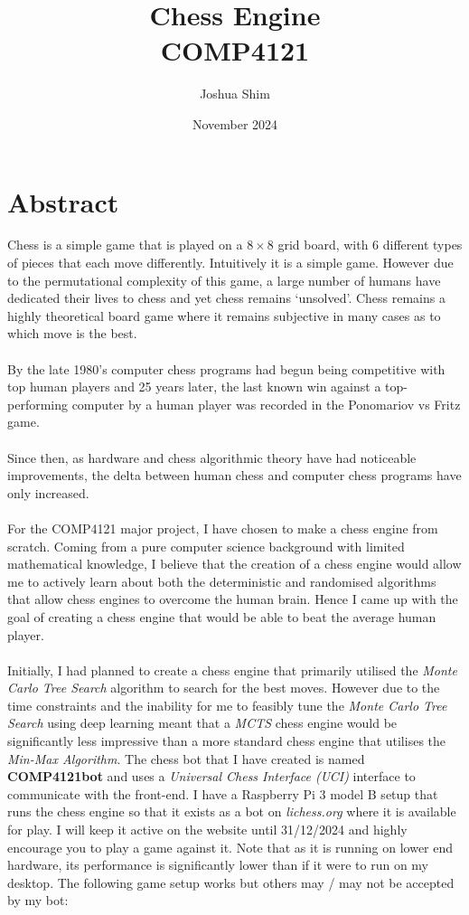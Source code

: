 \documentclass[a4paper,12pt]{report}
\title{Chess Engine\\
{\Large COMP4121}}
\author{Joshua Shim}
\date{November 2024}
\begin{document}
\maketitle
\chapter*{Abstract}

Chess is a simple game that is played on a $8 \times 8$ grid board, with 6 different types of pieces that each move differently. Intuitively it is a simple game. However due to the permutational complexity of this game, a large number of humans have dedicated their lives to chess and yet chess remains `unsolved'. Chess remains a highly theoretical board game where it remains subjective in many cases as to which move is the best.
\\\\
By the late 1980's computer chess programs had begun being competitive with top human players and 25 years later, the last known win against a top-performing computer by a human player was recorded in the Ponomariov vs Fritz game.
\\\\
Since then, as hardware and chess algorithmic theory have had noticeable improvements, the delta between human chess and computer chess programs have only increased.
\\\\
For the COMP4121 major project, I have chosen to make a chess engine from scratch. Coming from a pure computer science background with limited mathematical knowledge, I believe that the creation of a chess engine would allow me to actively learn about both the deterministic and randomised algorithms that allow chess engines to overcome the human brain. Hence I came up with the goal of creating a chess engine that would be able to beat the average human player.
\\\\
Initially, I had planned to create a chess engine that primarily utilised the \textit{Monte Carlo Tree Search} algorithm to search for the best moves. However due to the time constraints and the inability for me to feasibly tune the \textit{Monte Carlo Tree Search} using deep learning meant that a \textit{MCTS} chess engine would be significantly less impressive than a more standard chess engine that utilises the \textit{Min-Max Algorithm}.\newpage
The chess bot that I have created is named \textbf{COMP4121bot} and uses a \textit{Universal Chess Interface (UCI)} interface to communicate with the front-end. I have a Raspberry Pi 3 model B setup that runs the chess engine so that it exists as a bot on \textit{lichess.org} where it is available for play. I will keep it active on the website until 31/12/2024 and highly encourage you to play a game against it. Note that as it is running on lower end hardware, its performance is significantly lower than if it were to run on my desktop. The following game setup works but others may / may not be accepted by my bot:\\
\end{document}
